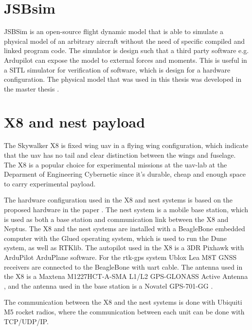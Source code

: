 \section{JSBsim}
JSBSim \citep{berndt2004jsbsim} is an open-source flight dynamic model that is able to simulate a physical model of an arbitrary aircraft without the need of specific compiled and linked program code. The simulator is design such that a third party software e.g. Ardupilot can expose the model to external forces and moments. This is useful in a SITL simulator for verification of software, which is design for a hardware configuration. The physical model that was used in this thesis was developed in the master thesis \citep{Gryte}.
\section{X8 and nest payload}\label{ss:X8andNest}
The Skywalker X8 is fixed wing \gls{uav} in a flying wing configuration, which indicate that the \gls{uav} has no tail and clear distinction between the wings and fuselage. The X8 is a popular choice for experimental missions at the \gls{uav}-lab at the Deparment of Engineering Cybernetic since it's durable, cheap and enough space to carry experimental payload.

The hardware configuration used in the X8 and nest systems is based on the proposed hardware in the paper \citep{zolich2015unmanned}. The nest system is a mobile base station, which is used as both a base station and communication link between the X8 and Neptus. The X8 and the nest systems are installed with a BeagleBone embedded computer with the Glued operating system, which is used to run the Dune system, as well as RTKlib. The autopilot used in the X8 is a 3DR Pixhawk with ArduPilot ArduPlane software. For the \gls{rtk-gps} system Ublox Lea M8T GNSS receivers \citep{UbloxDataSheet,UbloxReceiverDescription} are connected to the BeagleBone with uart cable. The antenna used in the X8 is a Maxtena M1227HCT-A-SMA L1/L2 GPS-GLONASS Active Antenna \citep{maxtena}, and the antenna used in the base station is a Novatel GPS-701-GG \citep{novatel}.

The communication between the X8 and the nest systems is done with Ubiquiti M5 rocket \citep{rocketM5} radios, where the communication between each unit can be done with TCP/UDP/IP.
\cleardoublepage
